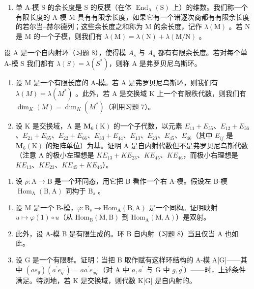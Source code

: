 \begin{enumerate}
\def\labelenumi{\arabic{enumi})}
\setcounter{enumi}{8}
\tightlist
\item
  单 A-模 S 的余长度是 S 的反模（在体 \(\operatorname{End}_{\mathrm{A}}(\mathrm{S})\) 上）的维数。我们称一个有限长度的 A-模 M 具有有限余长度，如果它有一个诸逐次商都有有限余长度的若尔当–赫尔德列；这些余长度之和称为 M 的余长度，记作 \(\lambda(\mathrm{M})\) 。若 N 是 M 的一个子模，则我们有 \(\lambda(\mathrm{M}) = \lambda(\mathrm{N}) + \lambda(\mathrm{M}/\mathrm{N})\) 。
\end{enumerate}

设 A 是一个自内射环（习题 8），使得模 \(A_{s}\) 与 \(A_{d}\) 都有有限余长度。若对每个单 A-模 S 我们都有 \(\lambda(S) = \lambda(S^{*})\)，则称 A 是弗罗贝尼乌斯环。

\begin{enumerate}
\def\labelenumi{\alph{enumi})}
\item
  设 M 是一个有限长度的 A-模。若 A 是弗罗贝尼乌斯环，则我们有 \(\lambda(M) = \lambda(M^{*})\) 。此外，若 A 是交换域 K 上一个有限秩代数，则我们有 \(\dim_K(M) = \dim_K(M^*)\)（利用习题 7）。
\item
  设 K 是交换域，A 是 \(\mathbf{M}_{6}(\mathrm{K})\) 的一个子代数，以元素 \(E_{11} + E_{55}\)、\(E_{12} + E_{56}\)、\(E_{21} + E_{65}\)、\(E_{22} + E_{66}\)、\(E_{33} + E_{44}\)、\(E_{13}\)、\(E_{23}\)、\(E_{45}\)、\(E_{46}\)（其中 \(E_{ij}\) 是 \(\mathbf{M}_{6}(\mathrm{K})\) 的矩阵单位）为基。证明 A 是自内射代数但不是弗罗贝尼乌斯代数（注意 A 的极小左理想是 \(KE_{13} + KE_{23}\)、\(KE_{45}\)、\(KE_{46}\)，而极小右理想是 \(KE_{13}\)、\(KE_{23}\)、\(KE_{45} + KE_{46}\)）。
\end{enumerate}

\begin{enumerate}
\def\labelenumi{\arabic{enumi})}
\setcounter{enumi}{9}
\tightlist
\item
  设 \(\rho : \mathrm{A} \to \mathrm{B}\) 是一个环同态，用它把 B 看作一个右 A-模。假设左 B-模 \(\operatorname{Hom}_{\mathrm{A}}(\mathrm{B}, \mathrm{A})\) 同构于 \(\mathrm{B}_s\) 。
\end{enumerate}

\begin{enumerate}
\def\labelenumi{\alph{enumi})}
\item
  设 M 是一个 B-模，\(\varphi : \mathrm{B}_s \to \mathrm{Hom}_{\mathrm{A}}(\mathrm{B}, \mathrm{A})\) 是一个同构。证明映射 \(u \mapsto \varphi(1) \circ u\)（从 \(\mathrm{Hom}_{\mathrm{B}}(\mathrm{M}, \mathrm{B})\) 到 \(\mathrm{Hom}_{\mathrm{A}}(\mathrm{M}, \mathrm{A})\)）是双射。
\item
  此外，设 A-模 B 是有限生成的。环 B 自内射（习题 8）当且仅当 A 也如此。
\item
  设 G 是一个有限群。证明：当把 B 取作赋有这样环结构的 A-模 A{[}G{]}——其中 \((ae_{g})(a^{\prime}e_{g^{\prime}})=aa^{\prime}e_{gg^{\prime}}\)（对 A 中 \(a,a^{\prime}\) 与 G 中 \(g,g^{\prime}\)）——时，上述条件满足。特别地，若 K 是交换域，则代数 K{[}G{]} 是自内射的。
\end{enumerate}

